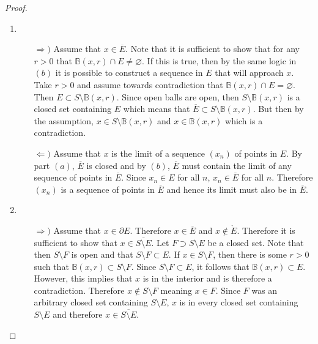 \documentclass[12pt,titlepage]{extarticle}
\begin{document}
\begin{proof}
\begin{enumerate}
\begin{enumerate}
        \end{enumerate}
        \item 
        \begin{enumerate}
            \item[$\Rightarrow)$] %
                Assume that $x \in \overline{E}$. Note that it is sufficient to show that for any $r>0$ that $\mathbb{B}(x,r) \cap E \neq \varnothing$. If this is true, then by the same logic in $(b)$ it is possible to construct a sequence in $E$ that will approach $x$. Take $r > 0$ and assume towards contradiction that $\mathbb{B}(x,r) \cap E = \varnothing$. Then $E \subset S \setminus \mathbb{B}(x,r)$. Since open balls are open, then $S \setminus \mathbb{B}(x,r)$ is a closed set containing $E$ which means that $\overline{E} \subset S \setminus \mathbb{B}(x,r)$. But then by the assumption, $x \in S \setminus \mathbb{B}(x,r)$ and $x \in \mathbb{B}(x,r)$ which is a contradiction.
            \item[$\Leftarrow)$] %
                Assume that $x$ is the limit of a sequence $(x_n)$ of points in $E$. By part $(a)$, $\overline{E}$ is closed and by $(b)$, $\overline{E}$ must contain the limit of any sequence of points in $\overline{E}$. Since $x_n \in E$ for all $n$, $x_n \in \overline{E}$ for all $n$. Therefore $(x_n)$ is a sequence of points in $\overline{E}$ and hence its limit must also be in $\overline{E}$.
        \end{enumerate}
        \item
        \begin{enumerate}
            \item[$\Rightarrow)$] %
                Assume that $x \in \partial E$. Therefore $x \in \overline{E}$ and $x \notin \mathring{E}$. Therefore it is sufficient to show that $x \in \overline{S \setminus E}$. Let $F \supset S \setminus E$ be a closed set. Note that then $S \setminus F$ is open and that $S \setminus F \subset E$. If $x \in S \setminus F$, then there is some $r > 0$ such that $\mathbb{B}(x,r) \subset S \setminus F$. Since $S \setminus F \subset E$, it follows that $\mathbb{B}(x,r) \subset E$. However, this implies that $x$ is in the interior and is therefore a contradiction. Therefore $x \notin S \setminus F$ meaning $x \in F$. Since $F$ was an arbitrary closed set containing $S \setminus E$, $x$ is in every closed set containing $S \setminus E$ and therefore $x \in \overline{S \setminus E}$.

\end{enumerate}
\end{enumerate}
\end{proof}
\end{document}
